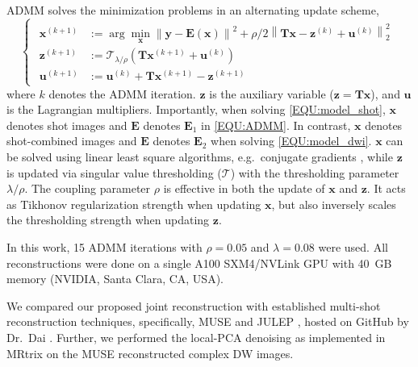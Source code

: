\documentclass[preprint,12pt,authoryear,review]{elsarticle}
\newcommand*{\norm}[1]{\left\lVert#1\right\rVert}
\newcommand{\argmin}{\arg\!\min}
\begin{document}
    ADMM solves the minimization problems in an alternating update scheme,
    \begin{equation}
        \left\{\begin{matrix}
            \begin{aligned}
                \mathbf{x}^{(k+1)} &:= \argmin_{\mathbf{x}} \norm{\mathbf{y} - \mathbf{E}(\mathbf{x})}^2 + \rho/2 \norm{\mathbf{T}\mathbf{x} - \mathbf{z}^{(k)} + \mathbf{u}^{(k)}}_2^2 \\
                \mathbf{z}^{(k+1)} &:= \mathcal{T}_{\lambda/\rho} (\mathbf{T} \mathbf{x}^{(k+1)} + \mathbf{u}^{(k)}) \\
                \mathbf{u}^{(k+1)} &:= \mathbf{u}^{(k)} + \mathbf{T} \mathbf{x}^{(k+1)} - \mathbf{z}^{(k+1)}
            \end{aligned}
        \end{matrix}\right.
        \label{EQU:ADMM}
    \end{equation}
    where $k$ denotes the ADMM iteration.
    $\mathbf{z}$ is the auxiliary variable ($\mathbf{z} = \mathbf{T}\mathbf{x}$),
    and $\textbf{u}$ is the Lagrangian multipliers.
    Importantly, when solving \cref{EQU:model_shot},
    $\textbf{x}$ denotes shot images and $\mathbf{E}$ denotes $\mathbf{E}_1$ in \cref{EQU:ADMM}.
    In contrast, $\textbf{x}$ denotes shot-combined images and $\mathbf{E}$ denotes $\mathbf{E}_2$
    when solving \cref{EQU:model_dwi}.
    $\mathbf{x}$ can be solved using linear least square algorithms,
    e.g.~conjugate gradients \citep{hestenes_1952_cg},
    while $\mathbf{z}$ is updated via singular value thresholding
    ($\mathcal{T}$) with the thresholding parameter $\lambda / \rho$.
    The coupling parameter $\rho$ is effective in both the update of $\mathbf{x}$ and $\mathbf{z}$.
    It acts as Tikhonov regularization strength when updating $\mathbf{x}$,
    but also inversely scales the thresholding strength when updating $\mathbf{z}$.

    In this work, 15 ADMM iterations with $\rho = 0.05$
    and $\lambda = 0.08$ were used.
    All reconstructions were done on a single A100 SXM4/NVLink GPU
    with \SI{40}{GB} memory (NVIDIA, Santa Clara, CA, USA).

    We compared our proposed joint reconstruction
    with established multi-shot reconstruction techniques,
    specifically, MUSE \citep{chen_2013_muse}
    and JULEP \citep{dai_2023_julep},
    hosted on GitHub by Dr.~Dai \citep{dai_2023_julep}.
    Further, we performed
    the local-PCA denoising \citep{cordero_2019_cplxdwi}
    as implemented in MRtrix \citep{Tournier_2019_mrtrix}
    on the MUSE reconstructed complex DW images.
\end{document}
